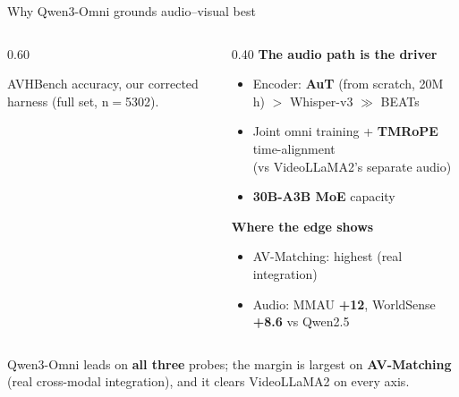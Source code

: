 \documentclass[aspectratio=169,11pt]{beamer}
\begin{document}
\begin{frame}{Why Qwen3-Omni grounds audio--visual best}
\begin{columns}[T]
\begin{column}{0.60\textwidth}
\centering
{}
{\scriptsize AVHBench accuracy, our corrected harness (full set, n$=$5302).}
\end{column}
\begin{column}{0.40\textwidth}\small
\textbf{The audio path is the driver}
\begin{itemize}\footnotesize
  \item Encoder: \textbf{AuT} (from scratch, 20M h) $>$ Whisper-v3 $\gg$ BEATs
  \item Joint omni training + \textbf{TMRoPE} time-alignment\\(vs VideoLLaMA2's separate audio)
  \item \textbf{30B-A3B MoE} capacity
\end{itemize}
\vspace{0.4em}
\textbf{Where the edge shows}
\begin{itemize}\footnotesize
  \item AV-Matching: highest (real integration)
  \item Audio: MMAU \textbf{+12}, WorldSense \textbf{+8.6} vs Qwen2.5
\end{itemize}
\end{column}
\end{columns}
\vspace{0.2em}
{\scriptsize Qwen3-Omni leads on \textbf{all three} probes; the margin is largest on
\textbf{AV-Matching} (real cross-modal integration), and it clears VideoLLaMA2 on every axis.}
\end{frame}
\end{document}
